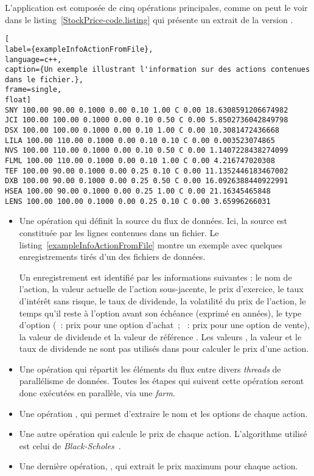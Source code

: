 L'application  est compos\'ee de cinq op\'erations principales, comme on peut le voir dans le listing~\ref{StockPrice-code.listing} qui présente un extrait de la version \ppff.

\begin{lstlisting}[
label={exampleInfoActionFromFile},
language=c++,
caption={Un exemple illustrant l'information sur des actions contenues dans le fichier.},
frame=single,
float]
SNY 100.00 90.00 0.1000 0.00 0.10 1.00 C 0.00 18.6308591206674982
JCI 100.00 100.00 0.1000 0.00 0.10 0.50 C 0.00 5.8502736042849798
DSX 100.00 100.00 0.1000 0.00 0.10 1.00 C 0.00 10.3081472436668
LILA 100.00 110.00 0.1000 0.00 0.10 0.10 C 0.00 0.003523074865
NVS 100.00 110.00 0.1000 0.00 0.10 0.50 C 0.00 1.1407228438274099
FLML 100.00 110.00 0.1000 0.00 0.10 1.00 C 0.00 4.216747020308
TEF 100.00 90.00 0.1000 0.00 0.25 0.10 C 0.00 11.1352446183467002
DXB 100.00 90.00 0.1000 0.00 0.25 0.50 C 0.00 16.0926388440922991
HSEA 100.00 90.00 0.1000 0.00 0.25 1.00 C 0.00 21.16345465848
LENS 100.00 100.00 0.1000 0.00 0.25 0.10 C 0.00 3.65996266031
\end{lstlisting}


\begin{itemize}

\item Une op\'eration  qui d\'efinit la source du flux de donn\'ees. Ici, la source est constitu\'ee par les lignes contenues dans un fichier. Le listing~\ref{exampleInfoActionFromFile} montre un exemple avec quelques enregistrements tir\'es d'un des fichiers de données. 

Un enregistrement est identifi\'e par les informations suivantes : le nom de l'action, la valeur actuelle de l'action sous-jacente, le prix d'exercice, le taux d'int\'er\^et sans risque, le taux de dividende, la volatilit\'e du prix de l'action, le temps qu'il reste \`a l'option avant son \'ech\'eance (exprim\'e en ann\'ees), le type d'option (~: prix pour une option d'achat~; ~: prix pour une option de vente), la valeur de dividende et la valeur de r\'ef\'erence . 
Les valeurs , la valeur et le taux de dividende ne sont pas utilis\'es dans  pour calculer le prix d'une action.

\item Une op\'eration  qui r\'epartit les \'el\'ements du flux entre divers \emph{threads} de parallélisme de données.
Toutes les \'etapes qui suivent cette op\'eration seront donc ex\'ecut\'ees en parall\`ele, via une \emph{farm}.

\item Une op\'eration , qui permet d'extraire le nom et les options de chaque action.

\item  Une autre op\'eration  qui calcule le prix de chaque action. L'algorithme utilis\'e est celui de \emph{Black-Scholes}~\citep{macbeth1979empirical}. 

\item Une derni\`ere op\'eration, , qui extrait le prix maximum pour chaque action.

\end{itemize}

